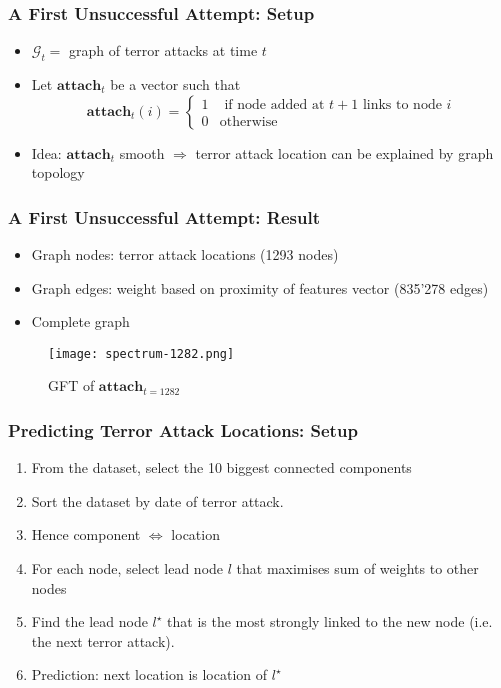 \begin{frame}
\frametitle{A First Unsuccessful Attempt: Setup}

\begin{itemize}

\item $\mathcal{G}_t = $ graph of terror attacks at time $t$

\item Let $\textbf{attach}_t$ be a vector such that
\begin{equation}
\textbf{attach}_t(i)= \begin{cases}
1 		& \text{ if node added at } t+1 \text{ links to node }i \\
0		& \text{otherwise}
\end{cases}
\end{equation}

\item Idea: $\textbf{attach}_t$ smooth $\Rightarrow$ terror attack location can be explained by graph topology 

\end{itemize}
\end{frame}

\begin{frame}
\frametitle{A First Unsuccessful Attempt: Result}

\begin{itemize}
\item Graph nodes: terror attack locations (1293 nodes)
\item Graph edges: weight based on proximity of features vector (835'278 edges)
\item Complete graph
\end{itemize}
\begin{figure}[H]
\begin{center}
\texttt{[image: spectrum-1282.png]}
\caption{GFT of $\textbf{attach}_{t=1282}$}
\label{fig:spectrum-1282}
\end{center}
\end{figure}

\end{frame}

\begin{frame}
\frametitle{Predicting Terror Attack Locations: Setup}
\begin{enumerate}
\item From the dataset, select the 10 biggest connected components
\item Sort the dataset by date of terror attack.
\item Hence component $\Leftrightarrow$ location
\item For each node, select lead node $l$ that maximises sum of weights to other nodes
\item Find the lead node $l^\star$ that is the most strongly linked to the new node (i.e. the next terror attack).
\item Prediction: next location is location of $l^\star$
\end{enumerate}
\end{frame}

